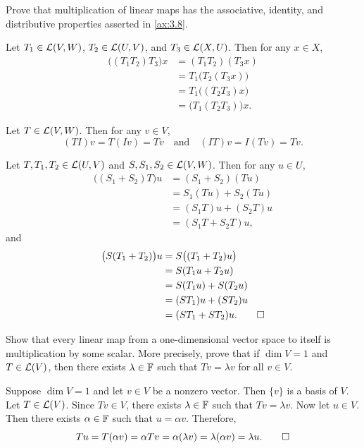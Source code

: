 \begin{exercise}
Prove that multiplication of linear maps has the associative, identity, and
distributive properties asserted in \ref{ax:3.8}.
\end{exercise}
\begin{solution}\leavevmode
\begin{parts}
\item Let $T_1\in\mathcal{L}(V,W)$, $T_2\in\mathcal{L}(U,V)$, and $T_3\in\mathcal{L}(X,U)$. Then
  for any $x\in X$,
  \begin{align*}
  \bigl((T_1T_2)T_3\bigr)x &= (T_1T_2)(T_3x)\\
    &= T_1\bigl(T_2(T_3x)\bigr)\\
    &= T_1\bigl((T_2T_3)x\bigr)\\
    &= \bigl(T_1(T_2T_3)\bigr)x.
  \end{align*}
\item Let $T\in\mathcal{L}(V,W)$. Then for any $v\in V$,
  \[ (TI)v=T(Iv)=Tv \quad\text{and}\quad (IT)v=I(Tv)=Tv. \]
\item Let $T,T_1,T_2\in\mathcal{L}(U,V)$ and $S,S_1,S_2\in\mathcal{L}(V,W)$. Then for any
  $u\in U$,
  \begin{align*}
  \bigl((S_1+S_2)T\bigr)u &= (S_1+S_2)(Tu)\\
    &= S_1(Tu)+S_2(Tu)\\
    &= (S_1T)u+(S_2T)u\\
    &= (S_1T+S_2T)u,
  \end{align*}
  and
  \begin{align*}
  \bigl(S(T_1+T_2)\bigr)u &= S\bigl((T_1+T_2)u\bigr)\\
    &= S(T_1u+T_2u)\\
    &= S(T_1u)+S(T_2u)\\
    &= (ST_1)u+(ST_2)u\\
    &= (ST_1+ST_2)u. \qedhere
  \end{align*}
\end{parts}
\end{solution}

\begin{exercise}
Show that every linear map from a one-dimensional vector space to itself is
multiplication by some scalar. More precisely, prove that if $\dim V=1$ and
$T\in\mathcal{L}(V)$, then there exists $\lambda\in\mathbb{F}$ such that $Tv=\lambda v$ for
all $v\in V$.
\end{exercise}
\begin{solution}
Suppose $\dim V=1$ and let $v\in V$ be a nonzero vector. Then $\{v\}$ is a
basis of $V$. Let $T\in\mathcal{L}(V)$. Since $Tv\in V$, there exists $\lambda\in\mathbb{F}$
such that $Tv=\lambda v$. Now let $u\in V$. Then there exists $\alpha\in\mathbb{F}$
such that $u=\alpha v$. Therefore,
\[ Tu=T(\alpha v)=\alpha Tv=\alpha(\lambda v)=\lambda(\alpha v)=\lambda u.
   \qedhere \]
\end{solution}

